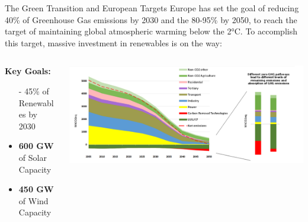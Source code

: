 \documentclass[aspectratio=169,hyperref={pdfpagelabels=false}]{beamer}
\begin{document}
    \begin{frame}{The Green Transition and European Targets}
    Europe has set the goal of reducing 40\% of Greenhouse Gas emissions by 2030 and the 80-95\% by 2050, to reach the target of maintaining global atmospheric warming below the 2°C. 
    To accomplish this target, massive investment in renewables is on the way:

    \vspace*{1em}

        \begin{columns}
      
          \begin{column}{0.4\textwidth}
            \textbf{Key Goals: }
            \begin{itemize}
                \item[-] 45\% of Renewables by 2030
            \end{itemize}
            \begin{itemize}
                \item \textbf{600 GW} of Solar Capacity
                \item \textbf{450 GW} of Wind Capacity
            \end{itemize}
            
          \end{column}
      
          \begin{column}{0.7\textwidth}
            \includegraphics[width=\textwidth]{img/pic1.png} %
          \end{column}
        \end{columns}
      \end{frame}
\end{document}
